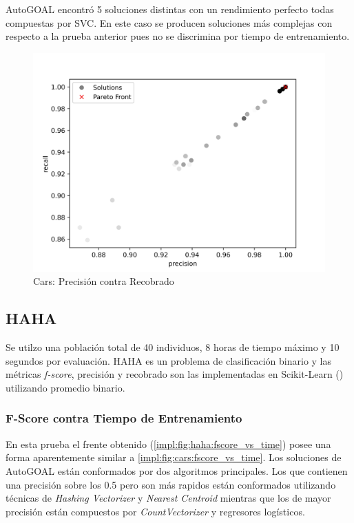 AutoGOAL encontr\'o 5 soluciones distintas con un rendimiento perfecto todas compuestas por SVC. En este caso se producen soluciones m\'as complejas con respecto a la prueba anterior pues no se discrimina por tiempo de entrenamiento.

\begin{figure}[ht]
    \centering
    \includegraphics[scale=0.65]{Pictures/cars_precision_vs_recall.jpg}
    \caption{Cars: Precisi\'on contra Recobrado}
    \label{impl:fig:cars:precision_vs_recall}
\end{figure}

\subsection{HAHA}
Se utilzo una poblaci\'on total de 40 individuos, 8 horas de tiempo m\'aximo y 10 segundos por  evaluaci\'on. 
HAHA es un problema de clasificaci\'on binario y las m\'etricas \textit{f-score}, precisi\'on y recobrado son las implementadas en Scikit-Learn (\cite{pedregosa2011scikit}) utilizando promedio binario.

\subsubsection{F-Score contra Tiempo de Entrenamiento}

En esta prueba el frente obtenido (\ref{impl:fig:haha:fscore_vs_time}) posee una forma aparentemente similar a \ref{impl:fig:cars:fscore_vs_time}. Los soluciones de AutoGOAL  est\'an conformados por dos algoritmos principales. Los que contienen una precisi\'on sobre los 0.5 pero son m\'as rapidos est\'an conformados utilizando t\'ecnicas de \textit{Hashing Vectorizer} y \textit{Nearest Centroid} mientras que los de mayor precisi\'on est\'an compuestos por \textit{CountVectorizer}  y regresores log\'isticos.

